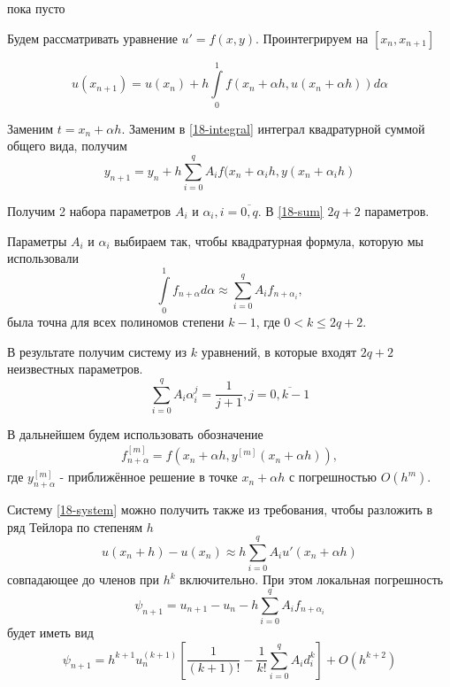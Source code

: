 \begin{col-answer-preambule}
	\begin{plan}
    \item пока пусто
	\end{plan}
\end{col-answer-preambule}


Будем рассматривать уравнение $u' = f(x, y)$. Проинтегрируем на $[x_n, x_{n + 1}]$

\begin{equation}
  \label{18-integral}
  u(x_{n + 1}) = u(x_n) + h\int\limits_0^1f(x_n + \alpha h, u(x_n + \alpha h))
  d\alpha
\end{equation}

Заменим $t = x_n + \alpha h$. Заменим в \eqref{18-integral} интеграл квадратурной
суммой общего вида, получим
\begin{equation}
  \label{18-sum}
  y_{n + 1} = y_n + h\sum\limits_{i = 0}^qA_if(x_n + \alpha_ih, y(x_n + \alpha_ih)
\end{equation}

Получим 2 набора параметров $A_i$ и $\alpha_i, i = \overline{0, q}$. В
\eqref{18-sum} $2q + 2$ параметров.

Параметры $A_i$ и $\alpha_i$ выбираем так, чтобы квадратурная формула, которую
мы использовали
\begin{equation}
  \label{18-quad-formula}
  \int\limits_0^1f_{n + \alpha}d\alpha \approx
  \sum\limits_{i = 0}^qA_if_{n + \alpha_i},
\end{equation}
была точна для всех полиномов степени $k - 1$, где $0 < k \leqslant 2q + 2$.

В результате получим систему из $k$ уравнений, в которые входят $2q + 2$
неизвестных параметров.
\begin{equation}
  \label{18-system}
  \sum\limits_{i = 0}^qA_i\alpha_i^j = \dfrac{1}{j + 1}, j = \overline{0, k - 1}
\end{equation}

В дальнейшем будем использовать обозначение
\begin{align*}
  f_{n + \alpha}^{[m]} = f(x_n + \alpha h, y^{[m]}(x_n + \alpha h)),
\end{align*}
где $y_{n + \alpha}^{[m]}$ - приближённое решение в точке $x_n + \alpha h$ с
погрешностью $O(h^m)$.

Систему \eqref{18-system} можно получить также из требования, чтобы разложить
в ряд Тейлора по степеням $h$
\begin{equation}
  u(x_n + h) - u(x_n) \approx h\sum\limits_{i = 0}^qA_iu'(x_n + \alpha h)
\end{equation}
совпадающее до членов при $h^k$ включительно. При этом локальная погрешность
\begin{equation}
  \psi_{n + 1} = u_{n + 1} - u_n - h\sum\limits_{i = 0}^qA_i f_{n + \alpha_i}
\end{equation}
будет иметь вид
\begin{equation}
  \psi_{n + 1} = h^{k + 1}u_n^{(k + 1)}\left[\dfrac{1}{(k + 1)!} -
  \dfrac{1}{k!}\sum\limits_{i = 0}^qA_i d_i^k\right] + O(h^{k + 2})
\end{equation}

